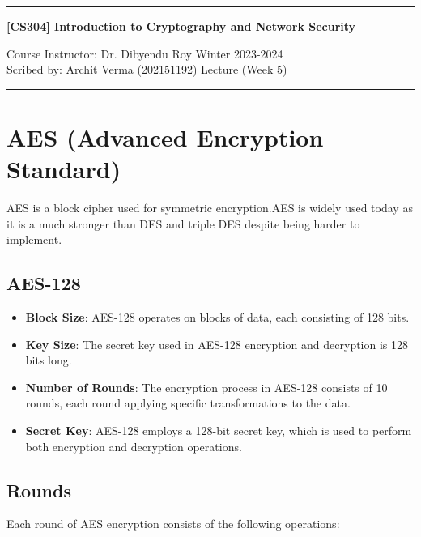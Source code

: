 \documentclass[11pt]{article}
\begin{document}
\noindent
\rule{\textwidth}{1pt}
\begin{center}
    {\bf [CS304] Introduction to Cryptography and Network Security}
\end{center}
Course Instructor: Dr. Dibyendu Roy \hfill Winter 2023-2024\\
Scribed by: Archit Verma (202151192) \hfill Lecture (Week 5)
\\
\rule{\textwidth}{1pt}

\section*{AES (Advanced Encryption Standard)}
AES is a block cipher used for symmetric encryption.AES is widely used today as it is a much stronger than DES and triple DES despite being harder to implement.

\subsection*{AES-128}
\begin{itemize}
    \item \textbf{Block Size}: AES-128 operates on blocks of data, each consisting of 128 bits.
    \item \textbf{Key Size}: The secret key used in AES-128 encryption and decryption is 128 bits long.
    \item \textbf{Number of Rounds}: The encryption process in AES-128 consists of 10 rounds, each round applying specific transformations to the data.
    \item \textbf{Secret Key}: AES-128 employs a 128-bit secret key, which is used to perform both encryption and decryption operations.
\end{itemize}

\subsection*{Rounds}
Each round of AES encryption consists of the following operations:
\end{document}
